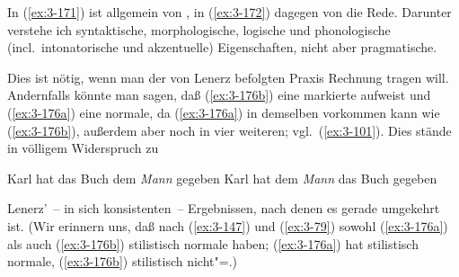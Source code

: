 \documentclass[output=paper]{langsci/langscibook}
\begin{document}
\addlines
In (\ref{ex:3-171}) ist allgemein von , in (\ref{ex:3-172}) dagegen von
 die Rede. Darunter verstehe ich
syntaktische, morphologische, logische und phonologische
(incl.\ intonatorische und akzentuelle) Eigenschaften, nicht aber
pragmatische.

Dies ist nötig, wenn man der von Lenerz befolgten Praxis Rechnung
tragen will. Andernfalls könnte man \zb sagen, daß (\ref{ex:3-176b}) eine
markierte  aufweist und (\ref{ex:3-176a}) eine normale, da (\ref{ex:3-176a}) in demselben  vorkommen kann wie (\ref{ex:3-176b}), außerdem aber noch
in vier weiteren; vgl.\ (\ref{ex:3-101}). Dies stände in völligem Widerspruch zu
\begin{exe}
\ex
\label{ex:3-176}
\begin{xlist}
\ex
\label{ex:3-176a}
Karl hat das Buch dem \textit{Mann} gegeben
\ex
\label{ex:3-176b}
Karl hat dem \textit{Mann} das Buch gegeben
\end{xlist}
\end{exe}
Lenerz'~-- in sich konsistenten~-- Ergebnissen, nach denen es gerade
umgekehrt ist. (Wir erinnern uns, daß nach (\ref{ex:3-147}) und (\ref{ex:3-79}) sowohl (\ref{ex:3-176a}) als auch (\ref{ex:3-176b}) stilistisch normale  haben; (\ref{ex:3-176a}) hat stilistisch normale, (\ref{ex:3-176b}) stilistisch nicht"=.)
\end{document}
